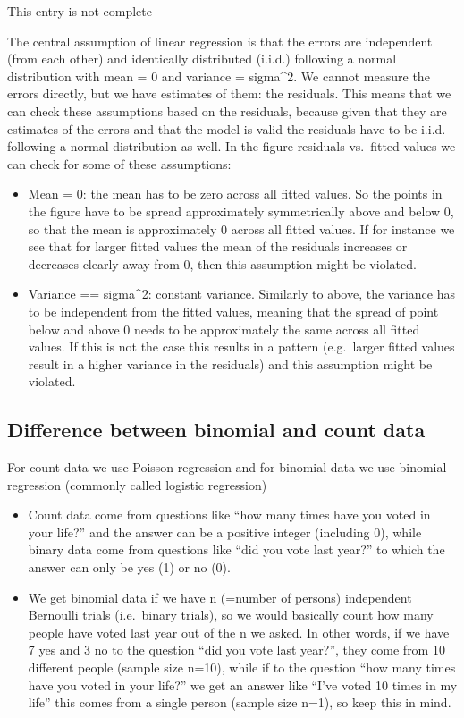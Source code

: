 \documentclass[
  letterpaper,
  8pt,
  a4paper]{book}
\providecommand{\tightlist}{%
  \setlength{\itemsep}{0pt}\setlength{\parskip}{0pt}}
\begin{document}
This entry is not complete

The central assumption of linear regression is that the errors are
independent (from each other) and identically distributed (i.i.d.)
following a normal distribution with mean = 0 and variance = sigma\^{}2.
We cannot measure the errors directly, but we have estimates of them:
the residuals. This means that we can check these assumptions based on
the residuals, because given that they are estimates of the errors and
that the model is valid the residuals have to be i.i.d. following a
normal distribution as well. In the figure residuals vs.~fitted values
we can check for some of these assumptions:

\begin{itemize}
\tightlist
\item
  Mean = 0: the mean has to be zero across all fitted values. So the
  points in the figure have to be spread approximately symmetrically
  above and below 0, so that the mean is approximately 0 across all
  fitted values. If for instance we see that for larger fitted values
  the mean of the residuals increases or decreases clearly away from 0,
  then this assumption might be violated.
\item
  Variance == sigma\^{}2: constant variance. Similarly to above, the
  variance has to be independent from the fitted values, meaning that
  the spread of point below and above 0 needs to be approximately the
  same across all fitted values. If this is not the case this results in
  a pattern (e.g.~larger fitted values result in a higher variance in
  the residuals) and this assumption might be violated.
\end{itemize}

\subsection*{Difference between binomial and count
data}\label{difference-between-binomial-and-count-data}

For count data we use Poisson regression and for binomial data we use
binomial regression (commonly called logistic regression)

\begin{itemize}
\tightlist
\item
  Count data come from questions like ``how many times have you voted in
  your life?'' and the answer can be a positive integer (including 0),
  while binary data come from questions like ``did you vote last year?''
  to which the answer can only be yes (1) or no (0).
\item
  We get binomial data if we have n (=number of persons) independent
  Bernoulli trials (i.e.~binary trials), so we would basically count how
  many people have voted last year out of the n we asked. In other
  words, if we have 7 yes and 3 no to the question ``did you vote last
  year?'', they come from 10 different people (sample size n=10), while
  if to the question ``how many times have you voted in your life?'' we
  get an answer like ``I've voted 10 times in my life'' this comes from
  a single person (sample size n=1), so keep this in mind.
\end{itemize}
\end{document}
